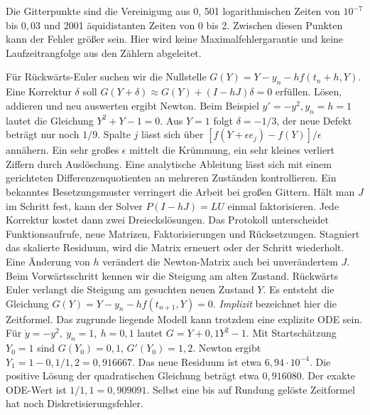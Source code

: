 Die Gitterpunkte sind die Vereinigung aus \(0\), 501 logarithmischen Zeiten von \(10^{-7}\) bis \(0{,}03\) und 2001 äquidistanten Zeiten von 0 bis 2. Zwischen diesen Punkten kann der Fehler größer sein. Hier wird keine Maximalfehlergarantie und keine Laufzeitrangfolge aus den Zählern abgeleitet.

\hypertarget{punkt3-2-1}{}
Für Rückwärts-Euler suchen wir die Nullstelle \(G(Y)=Y-y_n-hf(t_n+h,Y)\). Eine Korrektur \(\delta\) soll \(G(Y+\delta)\approx G(Y)+(I-hJ)\delta=0\) erfüllen. Lösen, addieren und neu auswerten ergibt Newton. Beim Beispiel \(y'=-y^2,y_n=h=1\) lautet die Gleichung \(Y^2+Y-1=0\). Aus \(Y=1\) folgt \(\delta=-1/3\), der neue Defekt beträgt nur noch \(1/9\).
\hypertarget{punkt3-2-2}{}
Spalte \(j\) lässt sich über \([f(Y+\epsilon e_j)-f(Y)]/\epsilon\) annähern. Ein sehr großes \(\epsilon\) mittelt die Krümmung, ein sehr kleines verliert Ziffern durch Auslöschung. Eine analytische Ableitung lässt sich mit einem gerichteten Differenzenquotienten an mehreren Zuständen kontrollieren. Ein bekanntes Besetzungsmuster verringert die Arbeit bei großen Gittern.
\hypertarget{punkt3-2-3}{}
Hält man \(J\) im Schritt fest, kann der Solver \(P(I-hJ)=LU\) einmal faktorisieren. Jede Korrektur kostet dann zwei Dreieckslösungen. Das Protokoll unterscheidet Funktionsaufrufe, neue Matrizen, Faktorisierungen und Rücksetzungen. Stagniert das skalierte Residuum, wird die Matrix erneuert oder der Schritt wiederholt. Eine Änderung von \(h\) verändert die Newton-Matrix auch bei unverändertem \(J\).
Beim Vorwärtsschritt kennen wir die Steigung am alten Zustand. Rückwärts Euler verlangt die Steigung am gesuchten neuen Zustand \(Y\). Es entsteht die Gleichung \(G(Y)=Y-y_n-hf(t_{n+1},Y)=0\). \emph{Implizit} bezeichnet hier die Zeitformel. Das zugrunde liegende Modell kann trotzdem eine explizite ODE sein.
Für \(\dot y=-y^2,\ y_n=1,\ h=0{,}1\) lautet \(G=Y+0{,}1Y^2-1\). Mit Startschätzung \(Y_0=1\) sind \(G(Y_0)=0{,}1\), \(G'(Y_0)=1{,}2\). Newton ergibt \(Y_1=1-0{,}1/1{,}2=0{,}916667\). Das neue Residuum ist etwa \(6{,}94\cdot10^{-4}\). Die positive Lösung der quadratischen Gleichung beträgt etwa \(0{,}916080\). Der exakte ODE-Wert ist \(1/1{,}1=0{,}909091\). Selbst eine bis auf Rundung gelöste Zeitformel hat noch Diskretisierungsfehler.

